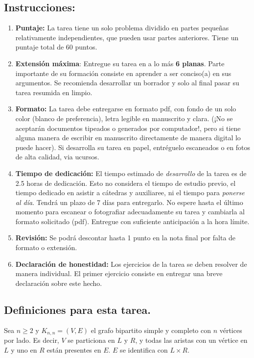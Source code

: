 \documentclass{article}
\theoremstyle{plain}
\theoremstyle{definition}
\theoremstyle{Azul}
\begin{document}
\subsection*{Instrucciones:} 
\begin{enumerate}
    \item \textbf{Puntaje:} La tarea tiene un solo problema dividido en partes pequeñas relativamente independientes, que pueden usar partes anteriores. Tiene un puntaje total de 60 puntos.
    \item \textbf{Extensión máxima}: Entregue su tarea en a lo más \textbf{6 planas}. Parte importante de su formación consiste en aprender a ser conciso(a) en sus argumentos. Se recomienda desarrollar un borrador y solo al final pasar su tarea resumida en limpio. 
    \item \textbf{Formato:} La tarea debe entregarse en formato pdf, con fondo de un solo color (blanco de preferencia), letra legible en manuscrito y clara. (¡No se aceptarán documentos tipeados o generados por computador!, pero si tiene alguna manera de escribir en manuscrito directamente de manera digital lo puede hacer).
    Si desarrolla su tarea en papel, entréguelo escaneados o en fotos de alta calidad, via ucursos.
    \item \textbf{Tiempo de dedicación:} El tiempo estimado de \emph{desarrollo} de la tarea es de 2.5 horas de dedicación. Esto no considera el tiempo de estudio previo, el tiempo dedicado en asistir a cátedras y auxiliaree, ni el tiempo para \emph{ponerse al día}. Tendrá un plazo de 7 días para entregarlo. No espere hasta el último momento para escanear o fotografiar adecuadamente su tarea y cambiarla al formato solicitado (pdf). Entregue con suficiente anticipación a la hora límite.
    \item \textbf{Revisión:} Se podrá descontar hasta 1 punto en la nota final por falta de formato o extensión.
    \item \textbf{Declaración de honestidad:} Los ejercicios de la tarea se deben resolver de manera individual. El primer ejercicio consiste en entregar una breve declaración sobre este hecho. 
    \end{enumerate}

\subsection*{Definiciones para esta tarea.} 

Sea $n\geq 2$ y $K_{n,n}=(V,E)$ el grafo bipartito simple y completo con $n$ vértices por lado. Es decir, $V$ se particiona en $L$ y $R$, y todas las aristas con un vértice en $L$ y uno en $R$ están presentes en $E$. $E$ se identifica con $L\times R$.
\end{document}

